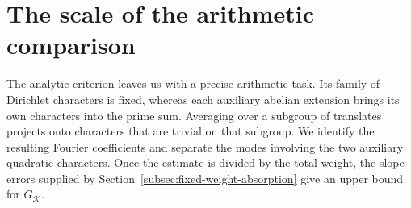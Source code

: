 \section{The scale of the arithmetic comparison}\label{sec:comparison}

The analytic criterion leaves us with a precise arithmetic task. Its family of
Dirichlet characters is fixed, whereas each auxiliary abelian extension brings its own
characters into the prime sum. Averaging over a subgroup of
translates projects onto characters that are trivial on that
subgroup. We identify the resulting Fourier coefficients and
separate the modes involving the two auxiliary quadratic
characters. Once the estimate is divided by the total weight,
the slope errors supplied by
Section~\ref{subsec:fixed-weight-absorption} give an upper bound
for \(G_{\mathcal K}\).

